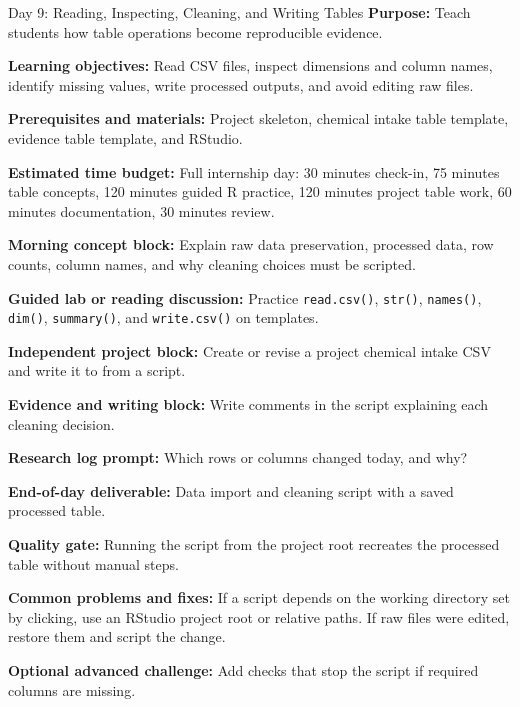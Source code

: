 \begin{dailybox}{Day 9: Reading, Inspecting, Cleaning, and Writing Tables}
\textbf{Purpose:} Teach students how table operations become reproducible evidence.

\textbf{Learning objectives:} Read CSV files, inspect dimensions and column names, identify missing values, write processed outputs, and avoid editing raw files.

\textbf{Prerequisites and materials:} Project skeleton, chemical intake table template, evidence table template, and RStudio.

\textbf{Estimated time budget:} Full internship day: 30 minutes check-in, 75 minutes table concepts, 120 minutes guided R practice, 120 minutes project table work, 60 minutes documentation, 30 minutes review.

\textbf{Morning concept block:} Explain raw data preservation, processed data, row counts, column names, and why cleaning choices must be scripted.

\textbf{Guided lab or reading discussion:} Practice \texttt{read.csv()}, \texttt{str()}, \texttt{names()}, \texttt{dim()}, \texttt{summary()}, and \texttt{write.csv()} on templates.

\textbf{Independent project block:} Create or revise a project chemical intake CSV and write it to  from a script.

\textbf{Evidence and writing block:} Write comments in the script explaining each cleaning decision.

\textbf{Research log prompt:} Which rows or columns changed today, and why?

\textbf{End-of-day deliverable:} Data import and cleaning script with a saved processed table.

\textbf{Quality gate:} Running the script from the project root recreates the processed table without manual steps.

\textbf{Common problems and fixes:} If a script depends on the working directory set by clicking, use an RStudio project root or relative paths. If raw files were edited, restore them and script the change.

\textbf{Optional advanced challenge:} Add checks that stop the script if required columns are missing.
\end{dailybox}

